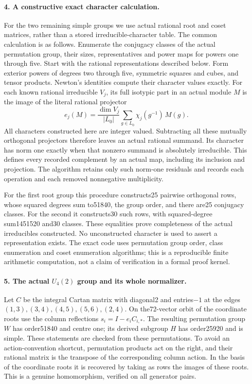 \paragraph{4. A constructive exact character calculation.}
For the two remaining simple groups we use actual rational root
and coset matrices, rather than a stored irreducible-character
table. The common calculation is as follows. Enumerate the
conjugacy classes of the actual permutation group, their sizes,
representatives and power maps for powers one through five.
Start with the rational representations described below.
Form exterior powers of degrees two through five, symmetric
squares and cubes, and tensor products. Newton's identities
compute their character values exactly. For each known rational
irreducible \(V_j\), its full isotypic part in an actual module
\(M\) is the image of the literal rational projector
\[
 e_j(M)=\frac{\dim V_j}{|L_0|}
           \sum_{g\in L_0}\chi_j(g^{-1})\,M(g).
                                                               \tag{G33.9}
\]
All characters constructed here are integer valued. Subtracting
all these mutually orthogonal projectors therefore leaves an
actual rational summand. Its character has norm one exactly when
that nonzero summand is absolutely irreducible. This defines
every recorded complement by an actual map, including its
inclusion and projection. The algorithm retains only such
norm-one residuals and records each operation and each removed
nonnegative multiplicity.

For the first root group this procedure constructs25 pairwise
orthogonal rows, whose squared degrees sum to51840, the group
order, and there are25 conjugacy classes. For the second it
constructs30 such rows, with squared-degree sum1451520 and30
classes. These equalities prove completeness of the actual
irreducibles constructed. No unconstructed character is used to
assert a representation exists. The exact code uses permutation
group order, class enumeration and coset enumeration algorithms;
this is a reproducible finite arithmetic computation, not a claim
of verification in a formal proof kernel.

\paragraph{5. The actual \(U_4(2)\) group and its whole normalizer.}
Let \(C\) be the integral Cartan matrix with diagonal2 and
entries\(-1\) at the edges
\((1,3),(3,4),(4,5),(5,6),(2,4)\).
On the72-vector orbit of the coordinate roots use the column
reflections \(s_i=I-e_iC_{i,*}\). The resulting permutation
group \(W\) has order51840 and centre one; its derived subgroup
\(H\) has order25920 and is simple. These statements are checked
from these permutations. To avoid an action-convention shortcut,
permutation products act on the right, and their rational matrix
is the transpose of the corresponding column action. In the
basis of the coordinate roots it is recovered by taking as rows
the images of these roots. This is a genuine homomorphism,
verified on all generator pairs.

